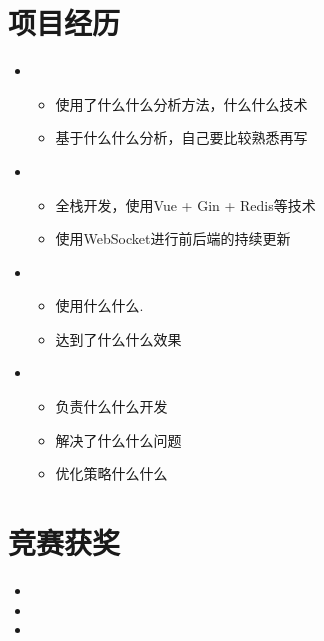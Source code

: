 \documentclass{resume}
\begin{document}
\section{项目经历}
\begin{itemize}
    \item {}
    \ \begin{itemize}
        \item 使用了什么什么分析方法，什么什么技术
        \item 基于什么什么分析，自己要比较熟悉再写
    \ \end{itemize}

    \item {}
    \ \begin{itemize}
      \item 全栈开发，使用Vue + Gin + Redis等技术
      \item 使用WebSocket进行前后端的持续更新
    \ \end{itemize}

    \item {}
    \ \begin{itemize}
      \item 使用什么什么.
      \item 达到了什么什么效果
    \ \end{itemize}

    \item {}
    \ \begin{itemize}
      \item 负责什么什么开发
      \item 解决了什么什么问题
      \item 优化策略什么什么
    \ \end{itemize}

  \end{itemize}

  \section{竞赛获奖}
\begin{itemize}[parsep=0.2ex]
\item {}
\item {}
\item {}
\end{itemize}
\end{document}

